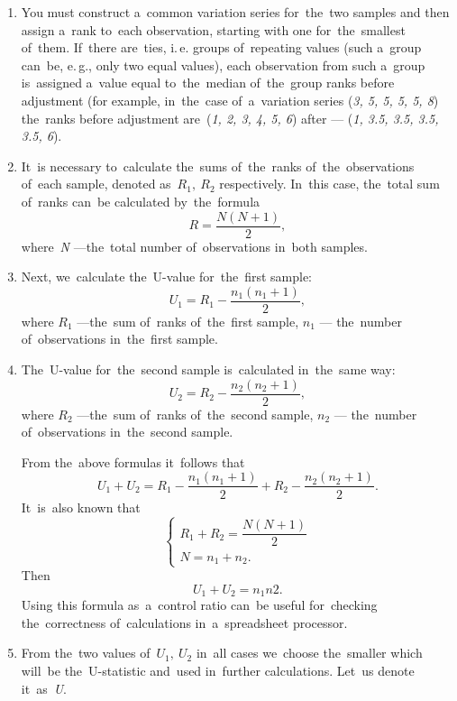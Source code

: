 \documentclass[russian,english]{scrreprt}
\begin{document}
\begin{enumerate}
	\item You must construct a~common variation series for~the~two samples and then assign a~rank to~each observation, starting with one for~the~smallest of~them. If~there are~ties, i.\,e. groups of~repeating values (such a~group can~be, e.\,g., only two equal values), each observation from such a~group is~assigned a~value equal to~the~median of~the~group ranks before adjustment (for example, in~the~case of~a~variation series (\textit{3, 5, 5, 5, 5, 8}) the~ranks before adjustment are~(\textit{1, 2, 3, 4, 5, 6}) after --- (\textit{1, 3.5, 3.5, 3.5, 3.5, 6}).
	\item It~is necessary to~calculate the~sums of~the~ranks of~the~observations of~each sample, denoted as~${R_{1},\ R_{2}}$ respectively. In~this case, the~total sum of~ranks can~be calculated by~the~formula
	\begin{equation}\label{eq:common-R}
	R = \frac{N(N+1)}{2},
	\end{equation}
	where~\textit{N} ---the~total number of~observations in~both samples.
	\item Next, we~calculate the~U-value for~the~first sample:
	\begin{equation}\label{eq:U1}
	U_{1}=R_{1}-\frac{n_{1}(n_{1}+1)}{2},
	\end{equation}
	where $R_{1}$ ---the~sum of~ranks of~the~first sample, $n_{1}$ --- the~number of~observations in~the~first sample.
	\item The~U-value for~the~second sample is~calculated in~the~same way:
	\begin{equation}\label{eq:U2}
	U_{2}=R_{2}-\frac{n_{2}(n_{2}+1)}{2},
	\end{equation}
	where $R_{2}$ ---the~sum of~ranks of~the~second sample, $n_{2}$ --- the~number of~observations in~the~second sample.
	
	From the~above formulas it~follows that
	\begin{equation}\label{eq:U1-U2-relation}
	U_{1}+U_{2} = R_{1}-\frac{n_{1}(n_{1}+1)}{2} + R_{2}-\frac{n_{2}(n_{2}+1)}{2}.
	\end{equation}
	It~is~also known that
	\begin{equation}\label{eq:R-N-relation}
	\begin{cases}
	R_{1}+R_{2}=\dfrac{N(N+1)}{2}\\
	N=n_{1}+n_{2}.
	\end{cases}
	\end{equation}
	Then
	\begin{equation}\label{eq:check-U-value}
	U_{1}+U_{2}=n_{1}n{2}.
	\end{equation}
	Using this formula as~a~control ratio can~be useful for~checking the~correctness of~calculations in~a~spreadsheet processor.
	\item From the~two values of~$U_{1},\ U_{2}$ in~all cases we~choose the~smaller which will~be the~U-statistic and~used in~further calculations. Let~us denote it~as~\emph{U}.
\end{enumerate}
%
\end{document}
